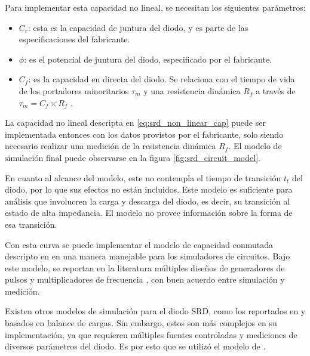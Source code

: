 Para implementar esta capacidad no lineal, se necesitan los siguientes
parámetros:

\begin{itemize}
    \item $C_r$: esta es la capacidad de juntura del diodo, y es parte de las
        especificaciones del fabricante.
    \item $\phi$: es el potencial de juntura del diodo, especificado por el
        fabricante.
    \item $C_f$: es la capacidad en directa del diodo. Se relaciona con el
        tiempo de vida de los portadores minoritarios $\tau_m$ y una resistencia
        dinámica $R_f$ a través de $\tau_m = C_f \times R_f$ \cite{Kotzebue1965}.
\end{itemize}

La capacidad no lineal descripta en \ref{eq:srd_non_linear_cap} puede ser
implementada entonces con los datos provistos por el fabricante, solo siendo
necesario realizar una medición de la resistencia dinámica $R_f$. El modelo de
simulación final puede observarse en la figura \ref{fig:srd_circuit_model}.

En cuanto al alcance del modelo, este no contempla el tiempo de transición $t_t$
del diodo, por lo que sus efectos no están incluidos. Este modelo es suficiente
para análisis que involucren la carga y descarga del diodo, es decir, su
transición al estado de alta impedancia. El modelo no provee información sobre
la forma de esa transición.

Con esta curva se puede implementar el modelo de capacidad conmutada descripto
en \cite{moll1969} en una manera manejable para los simuladores de circuitos.
Bajo este modelo, se reportan en la literatura múltiples diseños de generadores
de pulsos \cite{Ruengwaree2006} \cite{Rahman2022} y multiplicadores de
frecuencia \cite{zhang1996} \cite{Heymann2001}, con buen acuerdo entre
simulación y medición.

Existen otros modelos de simulación para el diodo SRD, como los reportados en
\cite{Opalska1997} y \cite{Shevchenko2022} basados en balance de cargas. Sin
embargo, estos son más complejos en su implementación, ya que requieren
múltiples fuentes controladas y mediciones de diversos parámetros del diodo. Es
por esto que se utilizó el modelo de \cite{zhang1995}.


